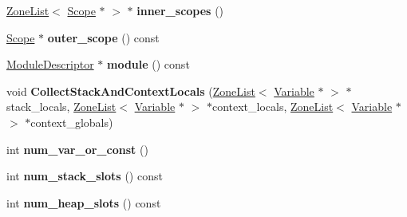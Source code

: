 \begin{DoxyCompactItemize}
\item 
\hyperlink{classv8_1_1internal_1_1_zone_list}{Zone\+List}$<$ \hyperlink{classv8_1_1internal_1_1_scope}{Scope} $\ast$ $>$ $\ast$ {\bfseries inner\+\_\+scopes} ()\hypertarget{classv8_1_1internal_1_1_scope_a0e4d097ff1d3d529fecd08644a1131ba}{}\label{classv8_1_1internal_1_1_scope_a0e4d097ff1d3d529fecd08644a1131ba}

\item 
\hyperlink{classv8_1_1internal_1_1_scope}{Scope} $\ast$ {\bfseries outer\+\_\+scope} () const \hypertarget{classv8_1_1internal_1_1_scope_a103ace9a050c875d3df6e9f1152765f8}{}\label{classv8_1_1internal_1_1_scope_a103ace9a050c875d3df6e9f1152765f8}

\item 
\hyperlink{classv8_1_1internal_1_1_module_descriptor}{Module\+Descriptor} $\ast$ {\bfseries module} () const \hypertarget{classv8_1_1internal_1_1_scope_a6ccaf270c0265298da2e0dd2b2a007de}{}\label{classv8_1_1internal_1_1_scope_a6ccaf270c0265298da2e0dd2b2a007de}

\item 
void {\bfseries Collect\+Stack\+And\+Context\+Locals} (\hyperlink{classv8_1_1internal_1_1_zone_list}{Zone\+List}$<$ \hyperlink{classv8_1_1internal_1_1_variable}{Variable} $\ast$ $>$ $\ast$stack\+\_\+locals, \hyperlink{classv8_1_1internal_1_1_zone_list}{Zone\+List}$<$ \hyperlink{classv8_1_1internal_1_1_variable}{Variable} $\ast$ $>$ $\ast$context\+\_\+locals, \hyperlink{classv8_1_1internal_1_1_zone_list}{Zone\+List}$<$ \hyperlink{classv8_1_1internal_1_1_variable}{Variable} $\ast$ $>$ $\ast$context\+\_\+globals)\hypertarget{classv8_1_1internal_1_1_scope_a171dd40d514939abeebee0775c820bea}{}\label{classv8_1_1internal_1_1_scope_a171dd40d514939abeebee0775c820bea}

\item 
int {\bfseries num\+\_\+var\+\_\+or\+\_\+const} ()\hypertarget{classv8_1_1internal_1_1_scope_ae644a88477f9835859d5958a21393167}{}\label{classv8_1_1internal_1_1_scope_ae644a88477f9835859d5958a21393167}

\item 
int {\bfseries num\+\_\+stack\+\_\+slots} () const \hypertarget{classv8_1_1internal_1_1_scope_ac39784ef532a81635569d1c0bac14a54}{}\label{classv8_1_1internal_1_1_scope_ac39784ef532a81635569d1c0bac14a54}

\item 
int {\bfseries num\+\_\+heap\+\_\+slots} () const \hypertarget{classv8_1_1internal_1_1_scope_a0fb01c6c7008dab7ee6420011381bb7a}{}\label{classv8_1_1internal_1_1_scope_a0fb01c6c7008dab7ee6420011381bb7a}


\end{DoxyCompactItemize}
